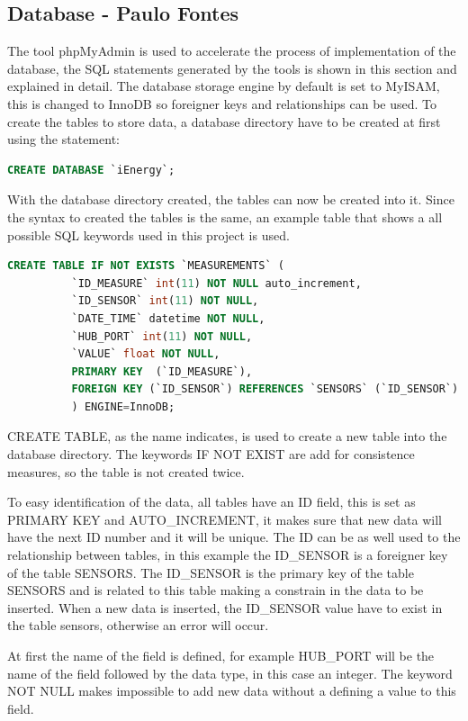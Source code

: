 \subsection{Database - Paulo Fontes}
The tool phpMyAdmin is used to accelerate the process of implementation of the database, the SQL statements generated by the tools is shown in this section and explained in detail.
The database storage engine by default is set to MyISAM, this is changed to InnoDB so foreigner keys and relationships can be used.
To create the tables to store data, a database directory have to be created at first using the statement:
\begin{lstlisting}[language=sql]
		CREATE DATABASE `iEnergy`;
\end{lstlisting}
With the database directory created, the tables can now be created into it. Since the syntax to created the tables is the same, an example table that shows a all possible SQL keywords used in this project is used.
\begin{lstlisting}[language=sql]
		CREATE TABLE IF NOT EXISTS `MEASUREMENTS` (
		  `ID_MEASURE` int(11) NOT NULL auto_increment,
		  `ID_SENSOR` int(11) NOT NULL,
		  `DATE_TIME` datetime NOT NULL,
		  `HUB_PORT` int(11) NOT NULL,
		  `VALUE` float NOT NULL,
		  PRIMARY KEY  (`ID_MEASURE`),
		  FOREIGN KEY (`ID_SENSOR`) REFERENCES `SENSORS` (`ID_SENSOR`)
		  ) ENGINE=InnoDB;
\end{lstlisting}

CREATE TABLE, as the name indicates, is used to create a new table into the database directory. The keywords IF NOT EXIST are add for consistence measures, so the table is not created twice.

To easy identification of the data, all tables have an ID field, this is set as PRIMARY KEY and AUTO\_INCREMENT, it makes sure that new data will have the next ID number and it will be unique. The ID can be as well used to the relationship between tables, in this example the ID\_SENSOR is a foreigner key of the table SENSORS. The ID\_SENSOR is the primary key of the table SENSORS and is related to this table making a constrain in the data to be inserted. When a new data is inserted, the ID\_SENSOR value have to exist in the table sensors, otherwise an error will occur.

At first the name of the field is defined, for example HUB\_PORT will be the name of the field followed by the data type, in this case an integer. The keyword NOT NULL makes impossible to add new data without a defining a value to this field.

